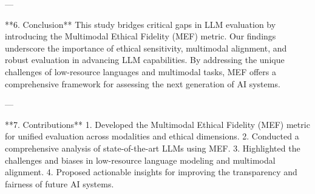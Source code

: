 ---

**6. Conclusion**  
This study bridges critical gaps in LLM evaluation by introducing the Multimodal Ethical Fidelity (MEF) metric. Our findings underscore the importance of ethical sensitivity, multimodal alignment, and robust evaluation in advancing LLM capabilities. By addressing the unique challenges of low-resource languages and multimodal tasks, MEF offers a comprehensive framework for assessing the next generation of AI systems.

---

**7. Contributions**  
1. Developed the Multimodal Ethical Fidelity (MEF) metric for unified evaluation across modalities and ethical dimensions.  
2. Conducted a comprehensive analysis of state-of-the-art LLMs using MEF.  
3. Highlighted the challenges and biases in low-resource language modeling and multimodal alignment.  
4. Proposed actionable insights for improving the transparency and fairness of future AI systems.  